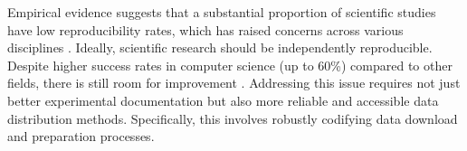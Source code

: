\documentclass{article}
\begin{document}







Empirical evidence suggests that a substantial proportion of scientific studies have low reproducibility
  rates, which has raised concerns across various disciplines \cite{baker_reproducibility_2016}.
Ideally, scientific research should be independently reproducible.
Despite higher success rates in computer science (up to 60\%) compared to other fields, there is still room for improvement
\cite{NEURIPS2019_c429429b, collberg2016repeatability, desai_what_2024}.
Addressing this issue requires not just better experimental documentation but also more reliable and
  accessible data distribution methods.
Specifically, this involves robustly codifying data download and preparation processes.
\end{document}
